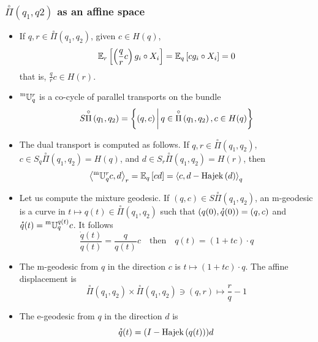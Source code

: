 \documentclass[xcolor=svgnames]{beamer}
\DeclareMathOperator{\Hajek}{Hajek}
\newcommand{\hajekof}[1]{\Hajek\left(#1\right)}
\newcommand{\openplan}[2]{\overset{\circ}\Pi\left(#1,#2\right)}
\begin{document}
\begin{frame}\small\frametitle{$\openplan{q_1}{q2}$ as an affine space}
\begin{itemize}
\item If $q , r \in \openplan {q_1} {q_2}$, given $c \in H(q)$,
\begin{equation*}
\operatorname{\mathbb E}_{r}\left[\left(\frac q r c\right) g_i \circ X_i\right] = \operatorname{\mathbb E}_{q}\left[c g_i \circ X_i\right] = 0
\end{equation*}
that is, $\frac q r c \in H(r)$.
\item $\prescript{\text{m}}{} {\mathbb U} _ {q} ^ {r}$ is a co-cycle of parallel transports on the bundle
\begin{equation*}
    S \openplan {q_1}{q_2} = \setof {(q,c)}{ q \in \openplan {q_1}{q_2}, c \in H(q)} 
\end{equation*}
\item The dual transport is computed as follows. If $q, r \in \openplan {q_1}{q_2}$, $c \in S_q \openplan {q_1}{q_2} = H(q)$, and $d \in S_r \openplan {q_1}{q_2} = H(r)$, then
\begin{equation*}
\scalarat r {\mtransport q r c} d = \expectat q {cd} = \scalarat q c {d - \hajekof d}
\end{equation*}
\item Let us compute the mixture geodesic. If $(q,c) \in S \openplan {q_1}{q_2}$, an m-geodesic is a curve in $t \mapsto q(t) \in \openplan {q_1}{q_2}$ such that $(q(0),\accentset{\star}{q}(0)) = (q,c)$ and $\accentset{\star}{q}(t) = \prescript{\text{m}}{} {\mathbb U} _ {q} ^ {q(t)} c$. It follows
\begin{equation*}
    \frac {\dot q(t)}{q(t)} = \frac q {q(t)} c \quad \text{then} \quad q(t) = (1 +tc) \cdot q
\end{equation*}
\item The m-geodesic from $q$ in the direction $c$ is $t \mapsto (1+tc)\cdot q$. The affine displacement is
\begin{equation*}
 \openplan {q_1}{q_2} \times  \openplan {q_1}{q_2} \ni (q,r) \mapsto \frac r q - 1
\end{equation*}
\item The e-geodesic from $q$ in the direction $d$ is 
\begin{equation*}
\velocity q(t) = (I - \hajekof{q(t)})d 
\end{equation*}

\end{itemize}

\end{frame}
\end{document}
